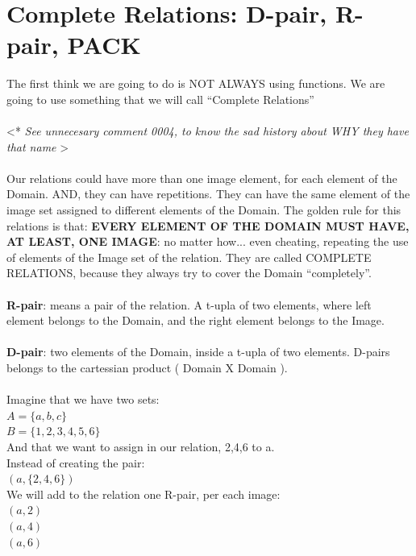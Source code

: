 \chapter{Complete Relations: D-pair, R-pair, PACK}

	\noindent
	The first think we are going to do is NOT ALWAYS using functions. We are going to use something that we will call ``Complete Relations''
	\\\\
	
	\noindent
	\textless ** \textit{See unnecesary comment 0004, to know the sad history about WHY they have that name} \textgreater
	\\\\
	
	\noindent
	Our relations could have more than one image element, for each element of the Domain. AND, they can have repetitions. They can have the same element of the image set assigned to different elements of the Domain. The golden rule for this relations is that: \textbf{EVERY ELEMENT OF THE DOMAIN MUST HAVE, AT LEAST, ONE IMAGE}: no matter how... even cheating, repeating the use of elements of the Image set of the relation. They are called COMPLETE RELATIONS, because they always try to cover the Domain ``completely''.
	\\\\
	
	\noindent
	\textbf{R-pair}: means a pair of the relation. A t-upla of two elements, where left element belongs to the Domain, and the right element belongs to the Image.
	\\\\
	
	\noindent
	\textbf{D-pair}: two elements of the Domain, inside a t-upla of two elements. D-pairs belongs to the cartessian product ( Domain X Domain ).
	\\\\
	
	\noindent
	Imagine that we have two sets:\\
	$ A=\{a,b,c\}$\\
	$ B=\{1,2,3,4,5,6\}$\\
	And that we want to assign in our relation, 2,4,6 to a.\\
	Instead of creating the pair:\\
	$(a, \{2,4,6\})$\\
	We will add to the relation one R-pair, per each image:\\
	$(a,2)$\\
	$(a,4)$\\
	$(a,6)$
	\\\\
	
